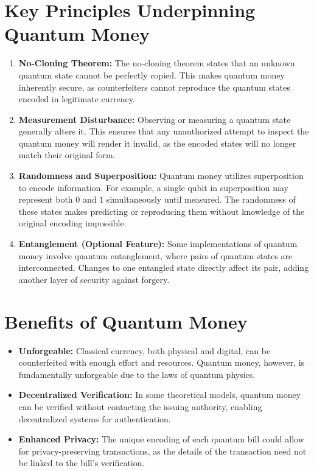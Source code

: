 \documentclass[11pt]{article}
\theoremstyle{definition}
\begin{document}
\section*{Key Principles Underpinning Quantum Money}
\begin{enumerate}
    \item \textbf{No-Cloning Theorem:} The no-cloning theorem states that an unknown quantum state cannot be perfectly copied. This makes quantum money inherently secure, as counterfeiters cannot reproduce the quantum states encoded in legitimate currency.
    \item \textbf{Measurement Disturbance:} Observing or measuring a quantum state generally alters it. This ensures that any unauthorized attempt to inspect the quantum money will render it invalid, as the encoded states will no longer match their original form.
    \item \textbf{Randomness and Superposition:} Quantum money utilizes superposition to encode information. For example, a single qubit in superposition may represent both $0$ and $1$ simultaneously until measured. The randomness of these states makes predicting or reproducing them without knowledge of the original encoding impossible.
    \item \textbf{Entanglement (Optional Feature):} Some implementations of quantum money involve quantum entanglement, where pairs of quantum states are interconnected. Changes to one entangled state directly affect its pair, adding another layer of security against forgery.
\end{enumerate}

\section*{Benefits of Quantum Money}
\begin{itemize}
    \item \textbf{Unforgeable:} Classical currency, both physical and digital, can be counterfeited with enough effort and resources. Quantum money, however, is fundamentally unforgeable due to the laws of quantum physics.
    \item \textbf{Decentralized Verification:} In some theoretical models, quantum money can be verified without contacting the issuing authority, enabling decentralized systems for authentication.
    \item \textbf{Enhanced Privacy:} The unique encoding of each quantum bill could allow for privacy-preserving transactions, as the details of the transaction need not be linked to the bill's verification.
\end{itemize}
\end{document}
